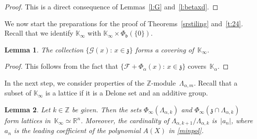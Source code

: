 \documentclass[12pt]{amsart}
\newtheorem{lemma}{Lemma}[section]
\theoremstyle{definition}
\theoremstyle{remark}
\numberwithin{equation}{section}
\begin{document}
\begin{proof}
This is a direct consequence of Lemmas~\ref{l:G} and~\ref{l:betaxd}.
\end{proof}

We now start the preparations for the proof of Theorems~\ref{srstiling} and~\ref{t:24}.
Recall that we identify $\mathbb{K}_\infty$ with $\mathbb{K}_\infty \times \Phi_\mathfrak{b}(\{0\})$.

\begin{lemma} \label{l:cover}
The collection $\{\mathcal{G}(x):\, x \in \mathfrak{z}\}$ forms a covering of~$\mathbb{K}_\infty$.
\end{lemma}

\begin{proof}
This follows from the fact that $\{\mathcal{F} + \Phi_\alpha(x):\, x \in \mathfrak{z}\}$ covers~$\mathbb{K}_\alpha$.
\end{proof}

In the next step, we consider properties of the $\mathbb{Z}$-module~$\Lambda_{\alpha,m}$. Recall that a subset of $\mathbb{K}_\infty$ is a lattice if it is a Delone set and an additive group.

\begin{lemma} \label{l:zLambda}
Let $k\in \mathbb{Z}$ be given. Then the sets $\Phi_\infty(\Lambda_{\alpha,k})$ and $\Phi_\infty(\mathfrak{z} \cap \Lambda_{\alpha,k})$ form lattices in~$\mathbb{K}_\infty \simeq \mathbb{R}^n$. Moreover,  the cardinality of $\Lambda_{\alpha,k+1} / \Lambda_{\alpha,k}$ is~$|a_n|$, where $a_n$ is the leading coefficient of the polynomial $A(X)$ in \eqref{minpol}.
\end{lemma}
\end{document}
